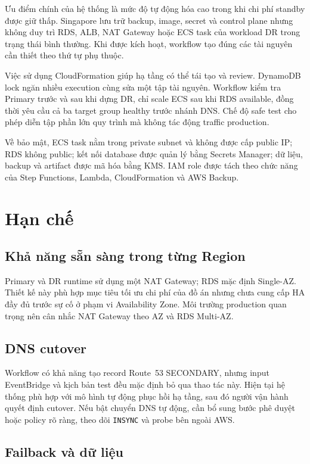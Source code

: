Ưu điểm chính của hệ thống là mức độ tự động hóa cao trong khi chi phí standby được giữ thấp. Singapore lưu trữ backup, image, secret và control plane nhưng không duy trì RDS, ALB, NAT Gateway hoặc ECS task của workload DR trong trạng thái bình thường. Khi được kích hoạt, workflow tạo đúng các tài nguyên cần thiết theo thứ tự phụ thuộc.

Việc sử dụng CloudFormation giúp hạ tầng có thể tái tạo và review. DynamoDB lock ngăn nhiều execution cùng sửa một tập tài nguyên. Workflow kiểm tra Primary trước và sau khi dựng DR, chỉ scale ECS sau khi RDS available, đồng thời yêu cầu cả ba target group healthy trước nhánh DNS. Chế độ safe test cho phép diễn tập phần lớn quy trình mà không tác động traffic production.

Về bảo mật, ECS task nằm trong private subnet và không được cấp public IP; RDS không public; kết nối database được quản lý bằng Secrets Manager; dữ liệu, backup và artifact được mã hóa bằng KMS. IAM role được tách theo chức năng của Step Functions, Lambda, CloudFormation và AWS Backup.

\section{Hạn chế}

\subsection{Khả năng sẵn sàng trong từng Region}

Primary và DR runtime sử dụng một NAT Gateway; RDS mặc định Single-AZ. Thiết kế này phù hợp mục tiêu tối ưu chi phí của đồ án nhưng chưa cung cấp HA đầy đủ trước sự cố ở phạm vi Availability Zone. Môi trường production quan trọng nên cân nhắc NAT Gateway theo AZ và RDS Multi-AZ.

\subsection{DNS cutover}

Workflow có khả năng tạo record Route~53 SECONDARY, nhưng input EventBridge và kịch bản test đều mặc định bỏ qua thao tác này. Hiện tại hệ thống phù hợp với mô hình tự động phục hồi hạ tầng, sau đó người vận hành quyết định cutover. Nếu bật chuyển DNS tự động, cần bổ sung bước phê duyệt hoặc policy rõ ràng, theo dõi \texttt{INSYNC} và probe bên ngoài AWS.

\subsection{Failback và dữ liệu}

